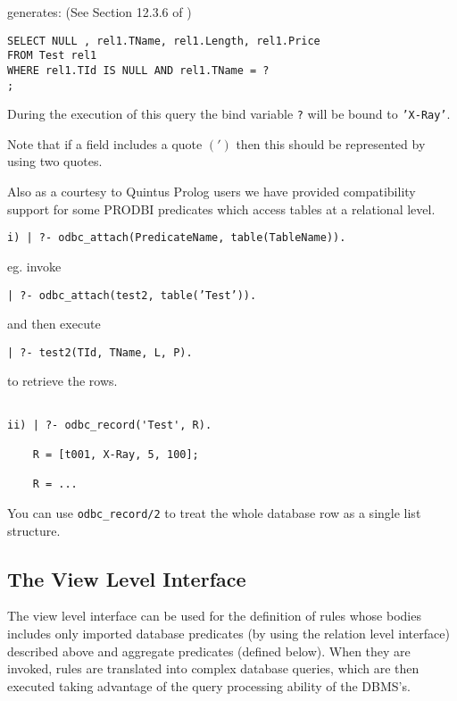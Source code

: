generates: (See Section 12.3.6 of \cite{xsb-manual})

\begin{verbatim}
SELECT NULL , rel1.TName, rel1.Length, rel1.Price
FROM Test rel1
WHERE rel1.TId IS NULL AND rel1.TName = ?
;
\end{verbatim}

During the execution of this query the bind variable {\tt ?} will be bound
to {\tt 'X-Ray'}.\newline

Note that if a field includes a quote $(')$ then this should be represented by
using two quotes.

Also as a courtesy to Quintus Prolog users we have provided
compatibility support for some PRODBI predicates which access tables
at a relational level.

\begin{verbatim}
i) | ?- odbc_attach(PredicateName, table(TableName)).
\end{verbatim}

eg. invoke 
\begin{center}
{\tt | ?- odbc\_attach(test2, table('Test')).} 
\end{center}
and then execute 
\begin{center}	
{\tt | ?- test2(TId, TName, L, P).}
\end{center}
to retrieve the rows.
\begin{verbatim}

ii) | ?- odbc_record('Test', R).

    R = [t001, X-Ray, 5, 100];

    R = ...

\end{verbatim}
    You can use {\tt odbc\_record/2} to treat the whole database row as a 
single list structure.

\subsection{The View Level Interface}

The view level interface can be used for the definition of rules
whose bodies includes only imported database predicates (by using the
relation level interface) described above and aggregate predicates
(defined below).  When they are invoked, rules are translated into complex
database queries, which are then executed taking advantage of the query
processing ability of the DBMS's.

